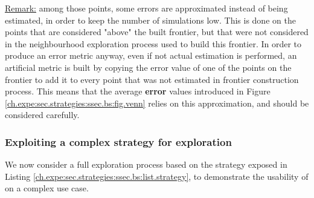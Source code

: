                 \underline{Remark:} among those points, some errors are approximated instead of being estimated, in order to keep the number of simulations low.
                This is done on the points that are considered "above" the built frontier, but that were not considered in the neighbourhood exploration process used to build this frontier.
                In order to produce an error metric anyway, even if not actual  estimation is performed, an artificial metric is built by copying the error value of one of the points on the frontier to add it to every point that was not estimated in frontier construction process.
                This means that the average {\bf error} values introduced in Figure \ref{ch.expe:sec.strategies:ssec.bs:fig.venn} relies on this approximation, and should be considered carefully.

\vspace{-0.1cm}
            \subsubsection{Exploiting a complex strategy for exploration}
                We now consider a full exploration process based on the strategy exposed in Listing \ref{ch.expe:sec.strategies:ssec.bs:list.strategy}, to demonstrate the usability of  on a complex use case.
                                
